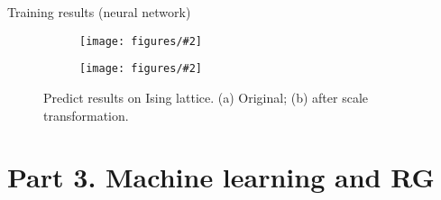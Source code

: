 \documentclass[aspectratio=169]{beamer}
\newcommand\imageinput[2][]{\texttt{[image: figures/\#2]}}
\begin{document}
\begin{frame}{Training results (neural network)}
\begin{figure}
  \centering
  \begin{subfigure}[b]{0.45\textwidth}
    \centering
    \imageinput[width=4.5cm]{ising-learning-net.pdf}
  \end{subfigure}
  \begin{subfigure}[b]{0.45\textwidth}
    \centering
    \imageinput[width=4.5cm]{ising-learning-net-scaled.pdf}
  \end{subfigure}
  \caption{Predict results on Ising lattice. (a) Original; (b) after scale transformation.}
\end{figure}
\end{frame}

\section{Part 3. Machine learning and RG}
\end{document}
